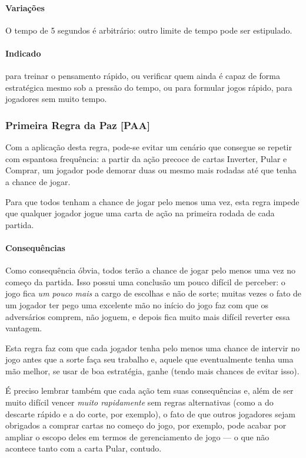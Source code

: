 \paragraph{Variações}

O tempo de 5 segundos é arbitrário: outro limite de tempo pode ser estipulado.

\paragraph{Indicado} 

para treinar o pensamento rápido, ou verificar quem ainda é capaz de forma estratégica mesmo sob a pressão do tempo, ou para formular jogos rápido, para jogadores sem muito tempo.

\subsubsection{Primeira Regra da Paz [PAA]}

Com a aplicação desta regra, pode-se evitar um cenário que consegue se repetir com espantosa frequência: a partir da ação precoce de cartas Inverter, Pular e Comprar, um jogador pode demorar duas ou mesmo mais rodadas até que tenha a chance de jogar.

Para que todos tenham a chance de jogar pelo menos uma vez, esta regra impede que qualquer jogador jogue uma carta de ação na primeira rodada de cada partida.

\paragraph{Consequências}

Como consequência óbvia, todos terão a chance de jogar pelo menos uma vez no começo da partida. Isso possui uma conclusão um pouco difícil de perceber: o jogo fica \emph{um pouco mais} a cargo de escolhas e não de sorte; muitas vezes o fato de um jogador ter pego uma excelente mão no início do jogo faz com que os adversários comprem, não joguem, e depois fica muito mais difícil reverter essa vantagem.

Esta regra faz com que cada jogador tenha pelo menos uma chance de intervir no jogo antes que a sorte faça seu trabalho e, aquele que eventualmente tenha uma mão melhor, se usar de boa estratégia, ganhe (tendo mais chances de evitar isso).

É preciso lembrar também que cada ação tem suas consequências e, além de ser muito difícil vencer \emph{muito rapidamente} sem regras alternativas (como a do descarte rápido e a do corte, por exemplo), o fato de que outros jogadores sejam obrigados a comprar cartas no começo do jogo, por exemplo, pode acabar por ampliar o escopo deles em termos de gerenciamento de jogo --- o que não acontece tanto com a carta Pular, contudo.

